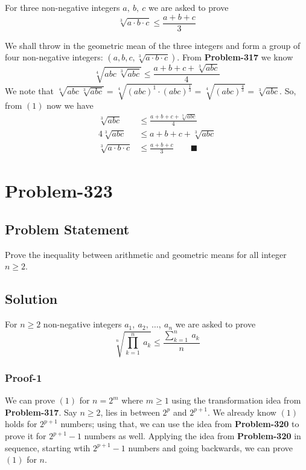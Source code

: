 \documentclass{article}
\begin{document}
For three non-negative integers $a,\ b,\ c$ we are asked to prove
\[
	\sqrt[3]{a \cdot b \cdot c} \leq \frac{a+b+c}{3}
\]

We shall throw in the geometric mean of the three integers and form a group of four non-negative integers: $(a,b,c,\sqrt[3]{a \cdot b \cdot c})$. From \textbf{Problem-317} we know
\setcounter{equation}{0}
\begin{equation}
	\sqrt[4]{ abc\ \sqrt[3]{abc} } \leq \frac{a+b+c+\sqrt[3]{abc}}{4}
\end{equation}
We note that $\sqrt[4]{ abc\ \sqrt[3]{abc} } = \sqrt[4]{ (abc)^1 \cdot (abc)^{\frac{1}{3}} } = \sqrt[4]{ (abc)^{\frac{4}{3}} } = \sqrt[3]{abc}$. So, from $(1)$ now we have
\begin{equation*}
	\begin{aligned}
		\sqrt[3]{abc} &\leq \frac{a+b+c+\sqrt[3]{abc}}{4}\\
		4\sqrt[3]{abc} &\leq a+b+c+\sqrt[3]{abc}\\
		\sqrt[3]{a \cdot b \cdot c} &\leq \frac{a+b+c}{3}\ \ \ \ \ \ \ \ \ \blacksquare
	\end{aligned}
\end{equation*}

\section*{Problem-323}
\subsection*{Problem Statement}
Prove the inequality between arithmetic and geometric means for all integer $n \geq 2$.

\subsection*{Solution}
For $n \geq 2$ non-negative integers $a_1,\ a_2,\ \ldots,\ a_n$ we are asked to prove
\setcounter{equation}{0}
\begin{equation}
	\sqrt[n]{\prod_{k=1}^{n}\ a_k} \leq \frac{\sum_{k=1}^{n}\ a_k}{n}
\end{equation}
\subsubsection*{Proof-1}
We can prove $(1)$ for $n = 2^{m}$ where $m \geq 1$ using the  transformation idea from \textbf{Problem-317}. Say $n \geq 2$, lies in between $2^{p}$ and $2^{p+1}$. We already know $(1)$ holds for $2^{p+1}$ numbers; using that, we can use the idea from \textbf{Problem-320} to prove it for $2^{p+1}-1$ numbers as well. Applying the idea from \textbf{Problem-320} in sequence, starting wtih $2^{p+1}-1$ numbers and going backwards, we can prove $(1)$ for $n$.
\end{document}
